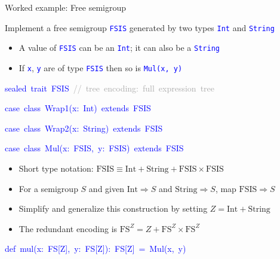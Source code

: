 \documentclass[english,,russian]{beamer}
\newenvironment{lyxcode}
  {\par\begin{list}{}{
    \setlength{\rightmargin}{\leftmargin}
    \setlength{\listparindent}{0pt}%
    \raggedright
    \setlength{\itemsep}{0pt}
    \setlength{\parsep}{0pt}
    \normalfont\ttfamily}%
   \def\{{\char`\{}
   \def\}{\char`\}}
   \def\textasciitilde{\char`\~}
   \item[]}
  {\end{list}}
\begin{document}
\begin{frame}{Worked example: Free semigroup}

{\footnotesize{}\vspace{-0.15cm}}Implement a free semigroup \texttt{\textcolor{blue}{\footnotesize{}FSIS}}
generated by two types \texttt{\textcolor{blue}{\footnotesize{}Int}}
and \texttt{\textcolor{blue}{\footnotesize{}String}} 
\begin{itemize}
\item A value of \texttt{\textcolor{blue}{\footnotesize{}FSIS}} can be an
\texttt{\textcolor{blue}{\footnotesize{}Int}}; it can also be a \texttt{\textcolor{blue}{\footnotesize{}String}} 
\item If \texttt{\textcolor{blue}{\footnotesize{}x}}, \texttt{\textcolor{blue}{\footnotesize{}y}}
are of type \texttt{\textcolor{blue}{\footnotesize{}FSIS}} then so
is \texttt{\textcolor{blue}{\footnotesize{}Mul(x, y)}} 
\end{itemize}
\begin{lyxcode}
\textcolor{blue}{\footnotesize{}sealed~trait~FSIS~}\textcolor{darkgray}{\footnotesize{}//~tree~encoding:~full~expression~tree}{\footnotesize\par}

\textcolor{blue}{\footnotesize{}case~class~Wrap1(x:~Int)~extends~FSIS}{\footnotesize\par}

\textcolor{blue}{\footnotesize{}case~class~Wrap2(x:~String)~extends~FSIS}{\footnotesize\par}

\textcolor{blue}{\footnotesize{}case~class~Mul(x:~FSIS,~y:~FSIS)~extends~FSIS}{\footnotesize\par}
\end{lyxcode}
\begin{itemize}
\item {\footnotesize{}\vspace{-0.15cm}}Short type notation: $\text{FSIS}\equiv\text{Int}+\text{String}+\text{FSIS}\times\text{FSIS}$ 
\item For a semigroup $S$ and given $\text{Int}\Rightarrow S$ and $\text{String}\Rightarrow S$,
map $\text{FSIS}\Rightarrow S$
\item Simplify and generalize this construction by setting $Z=\text{Int}+\text{String}$
\item The redundant encoding is $\text{FS}^{Z}=Z+\text{FS}^{Z}\times\text{FS}^{Z}$
\end{itemize}
\begin{lyxcode}
\textcolor{blue}{\footnotesize{}def~mul(x:~FS{[}Z{]},~y:~FS{[}Z{]}):~FS{[}Z{]}~=~Mul(x,~y)}{\footnotesize\par}


\end{lyxcode}
\end{frame}
\end{document}
